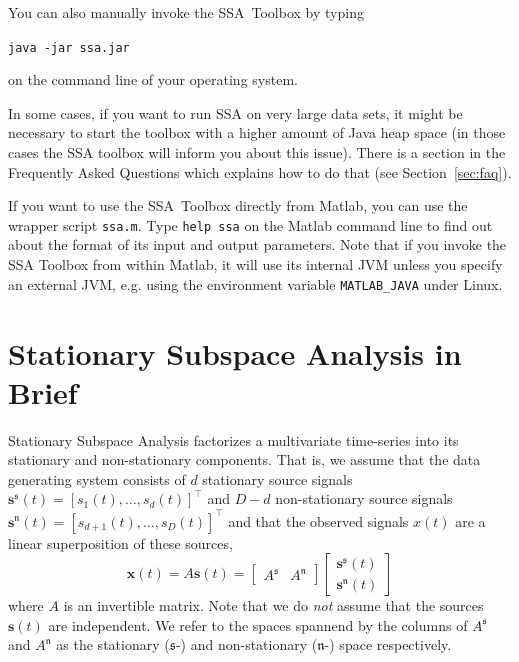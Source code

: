 \documentclass{article}
\newcommand{\1}{\ensuremath{\mathds{1}}}
\newcommand{\s}{\ensuremath{\mathfrak{s}}}
\newcommand{\n}{\ensuremath{\mathfrak{n}}}
\newcommand{\0}{\ensuremath{0}}
\begin{document}
You can also manually invoke the SSA~Toolbox by typing
\begin{center}
  \texttt{java -jar ssa.jar}
\end{center}
on the command line of your operating system.

In some cases, if you want to run SSA on very large data sets, it might be necessary to start the toolbox
with a higher amount of Java heap space (in those cases the SSA toolbox will inform you
about this issue). There is a section in the Frequently Asked Questions which explains how to do that
(see Section~\ref{sec:faq}).

If you want to use the SSA~Toolbox directly 
from Matlab, you can use the wrapper script \texttt{ssa.m}. Type \texttt{help ssa} on 
the Matlab command line to find out about the format of its input and output parameters. 
Note that if you invoke the SSA Toolbox from within Matlab, it will use its
internal JVM unless you specify an external JVM, e.g. using the environment
variable \texttt{MATLAB\_JAVA} under Linux.

\section{Stationary Subspace Analysis in Brief}

Stationary Subspace Analysis \cite{PRL:SSA:2009} factorizes a multivariate time-series 
into its stationary and non-stationary components. That is, we assume that the data 
generating system consists of $d$ stationary source signals 
${\mathbf s^\s}(t) = [s_1(t), \dots, s_d(t)]^\top$ and $D-d$ non-stationary source signals
${\mathbf s^\n}(t) = [s_{d+1}(t), \dots, s_D(t)]^\top$ and that the observed signals 
$x(t)$ are a linear superposition of these sources,
\begin{equation}
  {\mathbf x}(t) = A {\mathbf s}(t) = 
    \begin{bmatrix} A^{\s} & A^{\n} \end{bmatrix}
    \begin{bmatrix} {\mathbf s^{\s}}(t) \\ {\mathbf s^{\n}}(t) \end{bmatrix}
\label{eq:mixing_model}
\end{equation}
where $A$ is an invertible matrix. Note that we do \textit{not} assume that 
the sources ${\mathbf s}(t)$ are independent. We refer to the spaces spannend 
by the columns of $A^{\s}$ and $A^{\n}$ as the stationary ($\s$-) and 
non-stationary ($\n$-) space respectively.  
\end{document}
